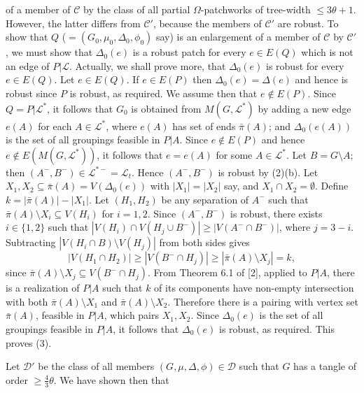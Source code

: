 \noindent of a member of $\mathscr{C}$ by the class of all partial $\Omega$-patchworks of tree-width $\le 3\theta + 1$. However, the latter differs from $\mathscr{C}'$, because the members of $\mathscr{C}'$ are robust. To show that $Q$ ($= (G_0, \mu_0, \Delta_0, \phi_0)$ say) is an enlargement of a member of $\mathscr{C}$ by $\mathscr{C}'$, we must show that $\Delta_0(e)$ is a robust patch for every $e \in E(Q)$ which is not an edge of $P|\mathscr{L}$. Actually, we shall prove more, that $\Delta_0(e)$ is robust for every $e \in E(Q)$. Let $e \in E(Q)$. If $e \in E(P)$ then $\Delta_0(e) = \Delta(e)$ and hence is robust since $P$ is robust, as required. We assume then that $e \notin E(P)$. Since $Q = P|\mathscr{L}^*$, it follows that $G_0$ is obtained from $M(G, \mathscr{L}^*)$ by adding a new edge $e(A)$ for each $A \in \mathscr{L}^*$, where $e(A)$ has set of ends $\bar{\pi}(A)$; and $\Delta_0(e(A))$ is the set of all groupings feasible in $P|A$. Since $e \notin E(P)$ and hence $e \notin E(M(G, \mathscr{L}^*))$, it follows that $e = e(A)$ for some $A \in \mathscr{L}^*$. Let $B = G \setminus A$; then $(A^-, B^-) \in \mathscr{L}^{*-} = \mathscr{L}_t$. Hence $(A^-, B^-)$ is robust by (2)(b). Let $X_1, X_2 \subseteq \bar{\pi}(A) = V(\Delta_0(e))$ with $|X_1| = |X_2|$ say, and $X_1 \cap X_2 = \emptyset$. Define $k = |\bar{\pi}(A)| - |X_1|$. Let $(H_1, H_2)$ be any separation of $A^-$ such that $\bar{\pi}(A) \setminus X_i \subseteq V(H_i)$ for $i = 1, 2$. Since $(A^-, B^-)$ is robust, there exists $i \in \{1, 2\}$ such that $|V(H_i) \cap V(H_j \cup B^-)| \ge |V(A^- \cap B^-)|$, where $j = 3 - i$. Subtracting $|V(H_i \cap B) \setminus V(H_j)|$ from both sides gives
\begin{equation*}
|V(H_1 \cap H_2)| \ge |V(B^- \cap H_j)| \ge |\bar{\pi}(A) \setminus X_j| = k,
\end{equation*}
since $\bar{\pi}(A) \setminus X_j \subseteq V(B^- \cap H_j)$. From Theorem 6.1 of [2], applied to $P|A$, there is a realization of $P|A$ such that $k$ of its components have non-empty intersection with both $\bar{\pi}(A) \setminus X_1$ and $\bar{\pi}(A) \setminus X_2$. Therefore there is a pairing with vertex set $\bar{\pi}(A)$, feasible in $P|A$, which pairs $X_1, X_2$. Since $\Delta_0(e)$ is the set of all groupings feasible in $P|A$, it follows that $\Delta_0(e)$ is robust, as required. This proves (3).

Let $\mathscr{D}'$ be the class of all members $(G, \mu, \Delta, \phi) \in \mathscr{D}$ such that $G$ has a tangle of order $\ge \frac{4}{3}\theta$. We have shown then that

